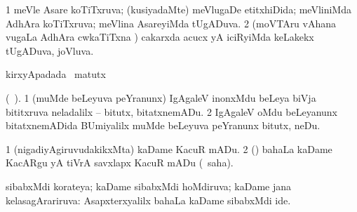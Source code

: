 \bentry
{} 
\gl{\gu}
\expl{}
\bmng
\bnum
\num{1} meVle Asare koTiTxruva; (kusiyadaMte) meVlugaDe etitxhiDida; meVliniMda AdhAra koTiTxruva; meVlina AsareyiMda tUgADuva. 
\num{2} (moVTAru vAhana \mo vugaLa AdhAra cwkaTiTxna \vi) cakarxda acucx yA iciRyiMda keLakekx tUgADuva, joVluva. 
\enum
\emng
\eentry

\bentry
{} 
\gl{\kirx}
\expl{}
\bmng
  kirxyApadada \BU\ matutx \BUkaq\ \rUpa 
\emng
\eentry

\bentry
{} 
\gl{\sakirx}
\expl{}
\bmng
 (\BUkaq\ ). 
\bnum
\num{1} (muMde beLeyuva peYranunx) IgAgaleV inonxMdu beLeya biVja bititxruva neladalilx -- bitutx, bitatxnemADu. 
\num{2} IgAgaleV oMdu beLeyanunx bitatxnemADida BUmiyalilx muMde beLeyuva peYranunx bitutx, neDu. 
\enum
\emng
\eentry

\bentry
{} 
\gl{\sakirx}
\bmng
\bnum
\num{1} (nigadiyAgiruvudakikxMta) kaDame KacuR mADu. 
\num{2} (\AtAmx) bahaLa kaDame KacARgu yA tiVrA savxlapx KacuR mADu (\akirx\ saha). 
\enum
\emng
\eentry

\bentry
{} 
\gl{\gu}
\expl{}
\bmng
 sibabxMdi korateya; kaDame sibabxMdi hoMdiruva; kaDame jana kelasagArariruva:  Asapxterxyalilx bahaLa kaDame sibabxMdi ide. 
\emng
\eentry

\bentry
{} 
\gl{\kirx}


